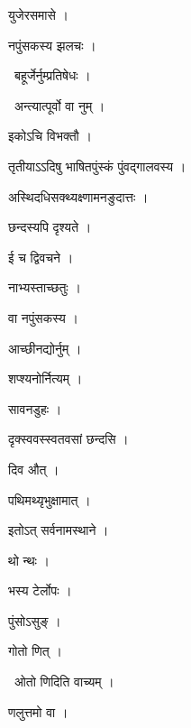 \documentclass[10pt, openany, oneside]{book}
\begin{document}
\noindent युजेरसमासे ।

\noindent नपुंसकस्य झलचः ।

\par\noindent\hspace{1.5em}{\vps वा॰}~{\qt बहूर्जेर्नुम्प्रतिषेधः ।}

\par\noindent\hspace{1.5em}{\vps वा॰}~{\qt अन्त्यात्पूर्वो वा नुम् ।}

\noindent इकोऽचि विभक्तौ ।

\noindent तृतीयाऽऽदिषु भाषितपुंस्कं पुंवद्गालवस्य ।

\noindent अस्थिदधिसक्थ्यक्ष्णामनङुदात्तः ।

\noindent छन्दस्यपि दृश्यते ।

\noindent ई च द्विवचने ।

\noindent नाभ्यस्ताच्छतुः ।

\noindent वा नपुंसकस्य ।

\noindent आच्छीनद्योर्नुम् ।

\noindent शप्श्यनोर्नित्यम् ।

\noindent सावनडुहः ।

\noindent दृक्स्ववस्स्वतवसां छन्दसि ।

\noindent दिव औत् ।

\noindent पथिमथ्यृभुक्षामात् ।

\noindent इतोऽत् सर्वनामस्थाने ।

\noindent थो न्थः ।

\noindent भस्य टेर्लोपः ।

\noindent पुंसोऽसुङ् ।

\noindent गोतो णित् ।

\par\noindent\hspace{1.5em}{\vps वा॰}~{\qt ओतो णिदिति वाच्यम् ।}

\noindent णलुत्तमो वा ।
\end{document}
